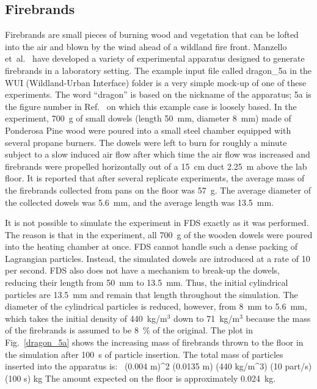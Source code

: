 \documentclass[11pt]{book}
\begin{document}
\subsection{Firebrands}
\label{info:firebrands}

Firebrands are small pieces of burning wood and vegetation that can be lofted into the air and blown by the wind ahead of a wildland fire front. Manzello et~al.~\cite{Manzello:FSJ2008a} have developed a variety of experimental apparatus designed to generate firebrands in a laboratory setting. The example input file called {\ct dragon\_5a} in the {\ct WUI} (Wildland-Urban Interface) folder is a very simple mock-up of one of these experiments. The word ``dragon'' is based on the nickname of the apparatus; 5a is the figure number in Ref.~\cite{Manzello:FSJ2008a} on which this example case is loosely based. In the experiment, 700~g of small dowels (length 50~mm, diameter 8~mm) made of Ponderosa Pine wood were poured into a small steel chamber equipped with several propane burners. The dowels were left to burn for roughly a minute subject to a slow induced air flow after which time the air flow was increased and firebrands were propelled horizontally out of a 15~cm duct 2.25~m above the lab floor. It is reported that after several replicate experiments, the average mass of the firebrands collected from pans on the floor was 57~g. The average diameter of the collected dowels was 5.6~mm, and the average length was 13.5~mm.

It is not possible to simulate the experiment in FDS exactly as it was performed. The reason is that in the experiment, all 700~g of the wooden dowels were poured into the heating chamber at once. FDS cannot handle such a dense packing of Lagrangian particles. Instead, the simulated dowels are introduced at a rate of 10 per second. FDS also does not have a mechanism to break-up the dowels, reducing their length from 50~mm to 13.5~mm. Thus, the initial cylindrical particles are 13.5~mm and remain that length throughout the simulation. The diameter of the cylindrical particles is reduced, however, from 8~mm to 5.6~mm, which takes the initial density of 440~kg/m$^3$ down to 71~kg/m$^3$ because the mass of the firebrands is assumed to be 8~\% of the original. The plot in Fig.~\ref{dragon_5a} shows the increasing mass of firebrands thrown to the floor in the simulation after 100~s of particle insertion. The total mass of particles inserted into the apparatus is:
\be \pi \, (0.004 \; {\rm m})^2 \times (0.0135 \; {\rm m}) \times (440 \; {\rm kg/m}^3) \times (10 \; {\rm part/s}) \times (100 \; {\rm s})  \; {\rm kg} \ee
The amount expected on the floor is approximately 0.024~kg.
\end{document}
